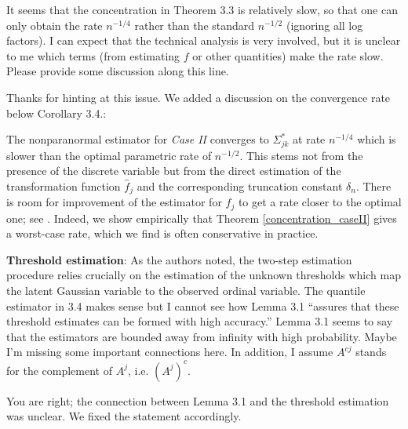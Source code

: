 \begin{point}
    It seems that the concentration in Theorem 3.3 is relatively slow, so that one can only obtain the rate \(n^{-1/4}\) rather than the standard \(n^{-1/2}\) (ignoring all log factors). I can expect that the technical analysis is very involved, but it is unclear to me which terms (from estimating \(f\) or other quantities) make the rate slow. Please provide some discussion along this line.
\end{point}

\begin{reply}
    Thanks for hinting at this issue. We added a discussion on the convergence rate below Corollary 3.4.:
\end{reply}

\begin{change}
    The nonparanormal estimator for \textit{Case II} converges to \(\Sigma_{jk}^*\) at rate \(n^{-1/4}\) which is slower than the optimal parametric rate of \(n^{-1/2}\). This stems not from the presence of the discrete variable but from the direct estimation of the transformation function \(\hat{f}_j\) and the corresponding truncation constant \(\delta_n\). There is room for improvement of the estimator for \(f_j\) to get a rate closer to the optimal one; see \citep{Xue12}. Indeed, we show empirically that Theorem \ref{concentration_caseII} gives a worst-case rate, which we find is often conservative in practice.
\end{change}


\reviewersection

\begin{point}
    \textbf{Threshold estimation}: As the authors noted, the two-step estimation procedure relies crucially on the estimation of the unknown thresholds which map the latent Gaussian variable to the observed ordinal variable. The quantile estimator in 3.4 makes sense but I cannot see how Lemma 3.1 “assures that these threshold estimates can be formed with high accuracy.” Lemma 3.1 seems to say that the estimators are bounded away from infinity with high probability. Maybe I’m missing some important connections here. In addition, I assume \(A^{cj}\) stands for the complement of \(
    A^j\), i.e. \((A^j)^c\).
\end{point}

\begin{reply}
    You are right; the connection between Lemma 3.1 and the threshold estimation was unclear. We fixed the statement accordingly.
\end{reply}

